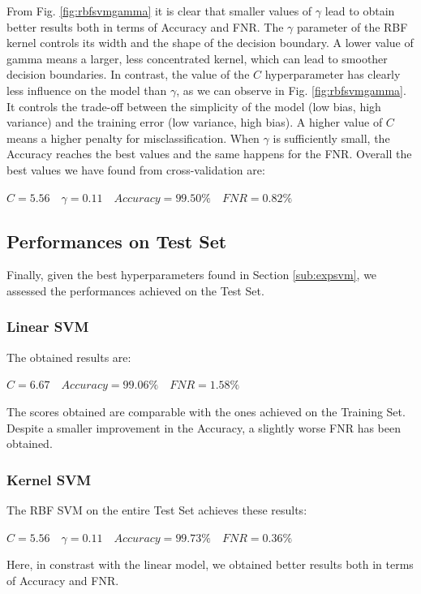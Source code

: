 \documentclass[twocolumn, switch]{article} %
\begin{document}
From Fig. \ref{fig:rbfsvmgamma} it is clear that smaller values of $\gamma$ lead to obtain better results both in terms of Accuracy and FNR. The $\gamma$ parameter of the RBF kernel controls its width and the shape of the decision boundary. A lower value of gamma means a larger, less concentrated kernel, which can lead to smoother decision boundaries.\newline
In contrast, the value of the $C$ hyperparameter has clearly less influence on the model than $\gamma$, as we can observe in Fig. \ref{fig:rbfsvmgamma}. It controls the trade-off between the simplicity of the model (low bias, high variance) and the training error (low variance, high bias). A higher value of $C$ means a higher penalty for misclassification.
When $\gamma$ is sufficiently small, the Accuracy reaches the best values and the same happens for the FNR.
Overall the best values we have found from cross-validation are:
\begin{center}
	$C=5.56\quad\gamma=0.11 \quad Accuracy=99.50\% \quad FNR=0.82\%$
\end{center}

\subsection{Performances on Test Set}
Finally, given the best hyperparameters found in Section \ref{sub:expsvm}, we assessed the performances achieved on the Test Set.
\subsubsection{Linear SVM}
The obtained results are:
\begin{center}
	$C=6.67 \quad Accuracy=99.06\% \quad FNR=1.58\%$
\end{center}
The scores obtained are comparable with the ones achieved on the Training Set. Despite a smaller improvement in the Accuracy, a slightly worse FNR has been obtained.

\subsubsection{Kernel SVM}
The RBF SVM on the entire Test Set achieves these results:
\begin{center}
	$C=5.56 \quad \gamma=0.11 \quad Accuracy=99.73\% \quad FNR=0.36\%$
\end{center}
Here, in constrast with the linear model, we obtained better results both in terms of Accuracy and FNR.
\end{document}
